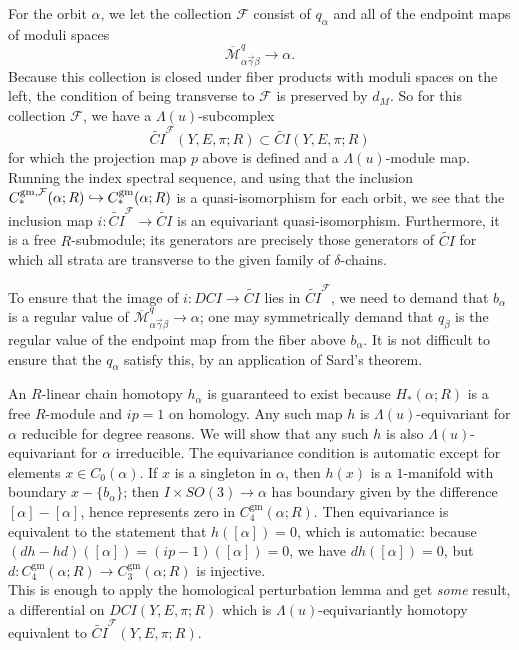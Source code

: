 \documentclass{memo-l}
\theoremstyle{definition}
\theoremstyle{remark}
\numberwithin{section}{chapter}
\numberwithin{equation}{chapter}
\begin{document}
For the orbit $\alpha$, we let the collection $\mathcal F$ consist of $q_\alpha$ and all of the endpoint maps of moduli spaces $$\overline{\mathcal M}^q_{\alpha \vec{\gamma} \beta} \to \alpha.$$ Because this collection is closed under fiber products with moduli spaces on the left, the condition of being transverse to $\mathcal F$ is preserved by $d_M$. So for this collection $\mathcal F$, we have a $\Lambda(u)$-subcomplex $$\widetilde{CI}^{\mathcal F}(Y,E,\pi;R) \subset \widetilde{CI}(Y,E,\pi;R)$$ for which the projection map $p$ above is defined and a $\Lambda(u)$-module map. Running the index spectral sequence, and using that the inclusion $C_*^{\textup{gm},\mathcal F}(\alpha;R) \hookrightarrow C_*^{\textup{gm}}(\alpha; R)$ is a quasi-isomorphism for each orbit, we see that the inclusion map $i: \widetilde{CI}^{\mathcal F} \to\widetilde{CI}$ is an equivariant quasi-isomorphism. Furthermore, it is a free $R$-submodule; its generators are precisely those generators of $\widetilde{CI}$ for which all strata are transverse to the given family of $\delta$-chains.

To ensure that the image of $i: DCI \to \widetilde{CI}$ lies in $\widetilde{CI}^{\mathcal F}$, we need to demand that $b_\alpha$ is a regular value of $\overline{\mathcal M}^{q}_{\alpha \vec{\gamma} \beta} \to \alpha$; one may symmetrically demand that $q_\beta$ is the regular value of the endpoint map from the fiber above $b_\alpha$. It is not difficult to ensure that the $q_\alpha$ satisfy this, by an application of Sard's theorem. 

An $R$-linear chain homotopy $h_\alpha$ is guaranteed to exist because $H_*(\alpha; R)$ is a free $R$-module and $ip = 1$ on homology. Any such map $h$ is $\Lambda(u)$-equivariant for $\alpha$ reducible for degree reasons. We will show that any such $h$ is also $\Lambda(u)$-equivariant for $\alpha$ irreducible. The equivariance condition is automatic except for elements $x \in C_0(\alpha)$. If $x$ is a singleton in $\alpha$, then $h(x)$ is a $1$-manifold with boundary $x - \{b_\alpha\}$; then $I \times SO(3) \to \alpha$ has boundary given by the difference $[\alpha] - [\alpha]$, hence represents zero in $C_4^{\text{gm}}(\alpha; R)$. Then equivariance is equivalent to the statement that $h([\alpha]) = 0$, which is automatic: because $(dh-hd)([\alpha]) = (ip-1)([\alpha]) = 0$, we have $d h([\alpha]) = 0$, but $d: C_4^{\text{gm}}(\alpha; R) \to C_3^{\text{gm}}(\alpha; R)$ is injective.\\

This is enough to apply the homological perturbation lemma and get \emph{some} result, a differential on $DCI(Y,E,\pi;R)$ which is $\Lambda(u)$-equivariantly homotopy equivalent to $\widetilde{CI}^{\mathcal F}(Y,E,\pi;R)$. 
\end{document}
